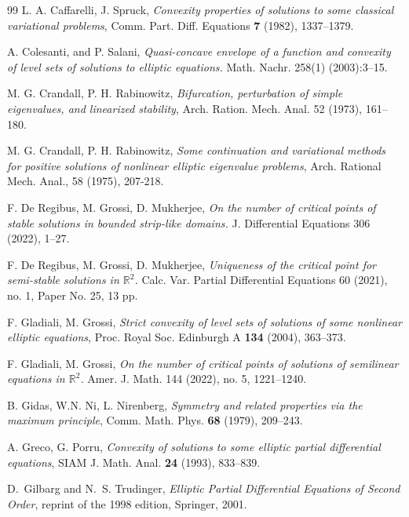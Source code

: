 \documentclass[reqno,12pt]{amsart}
\numberwithin{equation}{section}
\theoremstyle{remark}
\begin{document}
\begin{thebibliography}{99}
L. A. Caffarelli, J. Spruck,  \emph{Convexity properties of solutions to some classical variational problems}, Comm. Part. Diff. Equations  \textbf{7} (1982), 1337--1379.

A. Colesanti,  and P. Salani, \emph{Quasi-concave envelope of a function and convexity of level sets of solutions to elliptic equations.} Math. Nachr. 258(1) (2003):3--15.

 



 M. G. Crandall, P. H. Rabinowitz, \emph{ Bifurcation, perturbation of simple eigenvalues, and linearized stability}, Arch. Ration. Mech. Anal.  52 (1973), 161--180.

 M. G. Crandall, P. H. Rabinowitz,
\emph{Some continuation and variational methods for positive
solutions of nonlinear elliptic eigenvalue problems}, Arch. Rational Mech. Anal., 58 (1975), 207-218.

 

F. De Regibus, M. Grossi, D. Mukherjee, 
\emph{
On the number of critical points of stable solutions in bounded strip-like domains.}
J. Differential Equations 306 (2022), 1--27.

F. De Regibus, M. Grossi, D. Mukherjee, 
\emph{Uniqueness of the critical point for semi-stable solutions in $\mathbb R^2$.}  
Calc. Var. Partial Differential Equations 60 (2021), no. 1, Paper No. 25, 13 pp.

F. Gladiali, M. Grossi, \emph{Strict convexity of level sets of solutions of some nonlinear elliptic equations}, Proc.
Royal Soc. Edinburgh A \textbf{134} (2004), 363--373.

F. Gladiali, M. Grossi,
\emph{On the number of critical points of solutions of semilinear equations in $\mathbb R^2$.}
Amer. J. Math. 144 (2022), no. 5, 1221--1240.

B. Gidas, W.N. Ni, L. Nirenberg, \emph{Symmetry and related properties via the maximum principle}, Comm. Math. Phys. \textbf{68} (1979), 209--243.

A. Greco, G. Porru, \emph{Convexity of solutions to some elliptic partial differential equations}, SIAM J. Math. Anal.
\textbf{24} (1993), 833--839.

D.~Gilbarg and N.~S. Trudinger,
 \emph{Elliptic Partial Differential Equations of Second Order},
  reprint of the 1998 edition, Springer, 2001.


\end{thebibliography}
\end{document}
